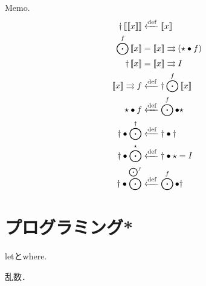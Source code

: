 \documentclass[twocolumn]{jsbook}
\newcommand{\identity}{\mathnormal{I}}
\begin{document}
Memo.
\begin{align*}
\monadjoin\monad{\monad{x}}&\defeq\monad{x}\\
\mapfunc^f\monad{x}&=\monad{x}\bind(\unit\comp f)\\
\monadjoin\monad{x}&=\monad{x}\bind\identity\\
\monad{x}\bind f&\defeq\monadjoin\mapfunc^f\monad{x}\\
\unit\comp f&\defeq\mapfunc^f\comp\unit\\
\monadjoin\comp\mapfunc^\monadjoin&\defeq\monadjoin\comp\monadjoin\\
\monadjoin\comp\mapfunc^\unit&\defeq\monadjoin\comp\unit=\identity\\
\monadjoin\comp\mapfunc^{\mapfunc^f}&\defeq\mapfunc^f\comp\monadjoin
\end{align*}

\chapter{プログラミング*}

letとwhere.

乱数．
\end{document}
